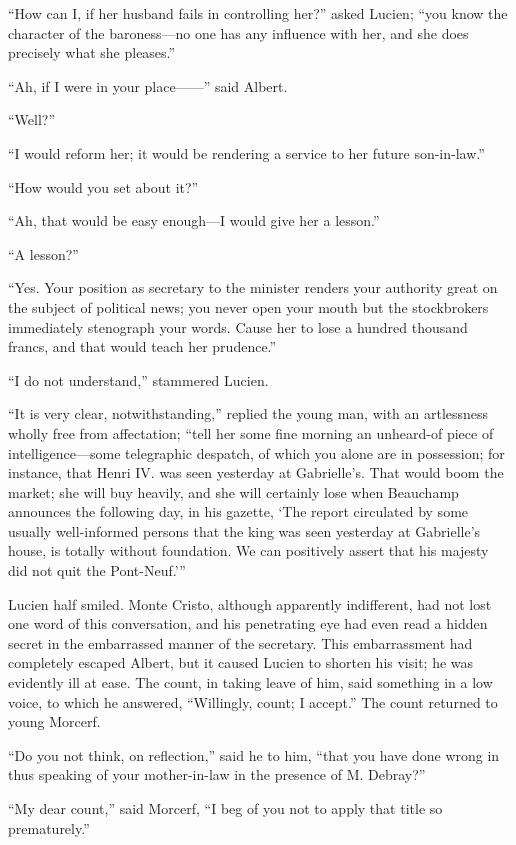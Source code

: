 “How can I, if her husband fails in controlling her?” asked Lucien;
“you know the character of the baroness—no one has any influence with
her, and she does precisely what she pleases.”

“Ah, if I were in your place——” said Albert.

“Well?”

“I would reform her; it would be rendering a service to her future
son-in-law.”

“How would you set about it?”

“Ah, that would be easy enough—I would give her a lesson.”

“A lesson?”

“Yes. Your position as secretary to the minister renders your authority
great on the subject of political news; you never open your mouth but
the stockbrokers immediately stenograph your words. Cause her to lose a
hundred thousand francs, and that would teach her prudence.”

“I do not understand,” stammered Lucien.

“It is very clear, notwithstanding,” replied the young man, with an
artlessness wholly free from affectation; “tell her some fine morning
an unheard-of piece of intelligence—some telegraphic despatch, of which
you alone are in possession; for instance, that Henri IV. was seen
yesterday at Gabrielle’s. That would boom the market; she will buy
heavily, and she will certainly lose when Beauchamp announces the
following day, in his gazette, ‘The report circulated by some usually
well-informed persons that the king was seen yesterday at Gabrielle’s
house, is totally without foundation. We can positively assert that his
majesty did not quit the Pont-Neuf.’”

Lucien half smiled. Monte Cristo, although apparently indifferent, had
not lost one word of this conversation, and his penetrating eye had
even read a hidden secret in the embarrassed manner of the secretary.
This embarrassment had completely escaped Albert, but it caused Lucien
to shorten his visit; he was evidently ill at ease. The count, in
taking leave of him, said something in a low voice, to which he
answered, “Willingly, count; I accept.” The count returned to young
Morcerf.

“Do you not think, on reflection,” said he to him, “that you have done
wrong in thus speaking of your mother-in-law in the presence of M.
Debray?”

“My dear count,” said Morcerf, “I beg of you not to apply that title so
prematurely.”

